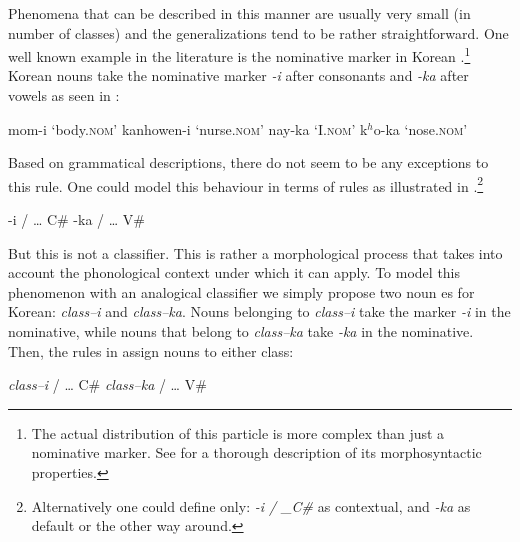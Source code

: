 Phenomena that can be described in this manner are usually very small (in number of classes) and the generalizations tend to be rather straightforward. One well known example in the literature is the nominative marker in Korean \autocite{Lee.1989, Song.2006}.\footnote{The actual distribution of this particle is more complex than just a nominative marker. See \textcite{Song.2006} for a thorough description of its morphosyntactic properties.} Korean nouns take the nominative marker \textit{-i} after consonants and \textit{-ka} after vowels as seen in :


\begin{exe}
    \ex \label{korean-examples}
    \begin{xlist}
        \ex mom-i `body.\textsc{nom}'
        \ex kanhowen-i `nurse.\textsc{nom}'
        \ex nay-ka `I.\textsc{nom}'
        \ex k$^h$o-ka `nose.\textsc{nom}'
    \end{xlist}
\end{exe}

Based on grammatical descriptions, there do not seem to be any exceptions to this rule. One could model this behaviour in terms of rules as illustrated in .\footnote{Alternatively one could define only: \textit{-i / \_C\#} as contextual, and \textit{-ka} as default or the other way around.}

\begin{exe}
    \ex \label{korean-classes}
    \begin{xlist}
        \ex -i / \dots{} C\#
        \ex -ka / \dots{} V\#
    \end{xlist}
\end{exe}

But this is not a classifier. This is rather a morphological process that takes into account the phonological context under which it can apply. To model this phenomenon with an analogical classifier we simply propose two noun es for Korean: \textit{class--i} and \textit{class--ka}. Nouns belonging to \textit{class--i} take the marker \textit{-i} in the nominative, while nouns that belong to \textit{class--ka} take \textit{-ka} in the nominative. Then, the rules in  assign nouns to either class:

\begin{exe}
    \ex \label{korean-classes-2}
    \begin{xlist}
        \ex \textit{class--i} / \dots{} C\#
        \ex \textit{class--ka} / \dots{} V\#
    \end{xlist}
\end{exe}


